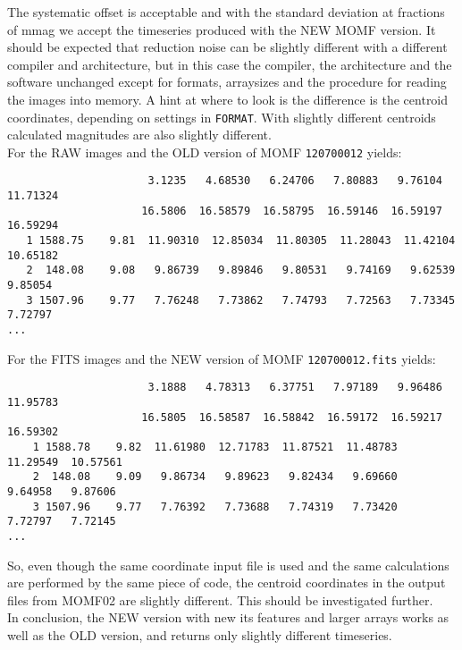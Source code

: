 \documentclass[11pt,a4paper,twoside]{article}
\begin{document}
The systematic offset is acceptable and with the standard deviation at fractions
of mmag we accept the timeseries produced with the NEW MOMF version. It should be
expected that reduction noise can be slightly different with a different compiler
and architecture, but in this case the compiler, the architecture and the software
unchanged except for formats, arraysizes and the procedure for reading the images
into memory. 
A hint at where to look is the difference is the centroid coordinates, depending on
settings in \texttt{FORMAT}. With slightly different centroids calculated magnitudes
are also slightly different.\\
For the RAW images and the OLD version of MOMF \texttt{120700012} yields:
\small
\begin{verbatim}
                      3.1235   4.68530   6.24706   7.80883   9.76104  11.71324
                     16.5806  16.58579  16.58795  16.59146  16.59197  16.59294
   1 1588.75    9.81  11.90310  12.85034  11.80305  11.28043  11.42104  10.65182
   2  148.08    9.08   9.86739   9.89846   9.80531   9.74169   9.62539   9.85054
   3 1507.96    9.77   7.76248   7.73862   7.74793   7.72563   7.73345   7.72797
...
\end{verbatim}
\normalsize
For the FITS images and the NEW version of MOMF \texttt{120700012.fits} yields:
\small
\begin{verbatim}
                      3.1888   4.78313   6.37751   7.97189   9.96486  11.95783
                     16.5805  16.58587  16.58842  16.59172  16.59217  16.59302
    1 1588.78    9.82  11.61980  12.71783  11.87521  11.48783  11.29549  10.57561
    2  148.08    9.09   9.86734   9.89623   9.82434   9.69660   9.64958   9.87606
    3 1507.96    9.77   7.76392   7.73688   7.74319   7.73420   7.72797   7.72145
...
\end{verbatim}
\normalsize
So, even though the same coordinate input file is used and the same calculations
are performed by the same piece of code, the centroid coordinates in the output
files from MOMF02 are slightly different. This should be investigated further.\\
In conclusion, the NEW version with new its features and larger arrays works as well
as the OLD version, and returns only slightly different timeseries.
\end{document}
